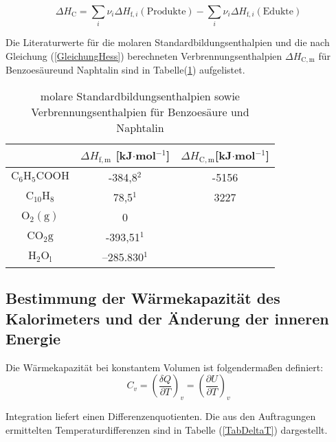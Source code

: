 \documentclass[12pt,a4paper,titlepage,headinclude,bibtotoc]{scrartcl}
\begin{document}
\begin{equation} \label{GleichungHess}
\Delta H_\mathrm{C} = \sum_i \nu_i\Delta H_{\mathrm{f},i}\mathrm{(Produkte)} - \sum_i \nu_i\Delta H_{\mathrm{f},i}\mathrm{(Edukte)}
\end{equation}

Die Literaturwerte für die molaren Standardbildungsenthalpien und die nach Gleichung (\ref{GleichungHess}) berechneten Verbrennungsenthalpien $\Delta H_\mathrm{C,m}$ für Benzoesäureund Naphtalin sind in  Tabelle(\ref{TABELLELiteraturwerte Bildungsenthalpien}) aufgelistet.\\

\begin{center}
\begin{table} \label{TABELLELiteraturwerte Bildungsenthalpien}
\caption{molare Standardbildungsenthalpien sowie Verbrennungsenthalpien für Benzoesäure und Naphtalin}
\begin{tabular}{c|c|c}
  & $\Delta H_{\mathrm{f,m}}$ [kJ$\cdot$mol$^{-1}$] &$\Delta H_\mathrm{C,m}$[kJ$\cdot$mol$^{-1}$]\\ 
 \hline 
 $\mathrm{C}_6\mathrm{H}_5\mathrm{COOH}$ & -384,8$^2$&-5156 \\ 
 \hline 
 $\mathrm{C}_{10}\mathrm{H}_8$ & 78,5$^1$ &3227\\
 \hline 
 $\mathrm{O}_2\mathrm{(g)}$ & 0 \\ 
 \hline 
 $\mathrm{CO}_2\mathrm{g}$ & -393,51$^1$ \\ 
 \hline 
 $\mathrm{H}_2\mathrm{O}_\mathrm{l}$ & –285.830$^1$ \\ 
 \end{tabular}  
\end{table}
\end{center}
\FloatBarrier


\subsection{Bestimmung der Wärmekapazität des Kalorimeters und der Änderung der inneren Energie}
Die Wärmekapazität bei konstantem Volumen ist folgendermaßen definiert:\\

\begin{equation}\label{Waermekapazitaet}
C_v = \left(\frac{\delta Q}{\partial T}\right)_v = \left(\frac{\partial U}{\partial T}\right)_v
\end{equation}


Integration liefert einen Differenzenquotienten. Die aus den Auftragungen ermittelten Temperaturdifferenzen sind in Tabelle (\ref{TabDeltaT}) dargestellt. 
\FloatBarrier
\end{document}
